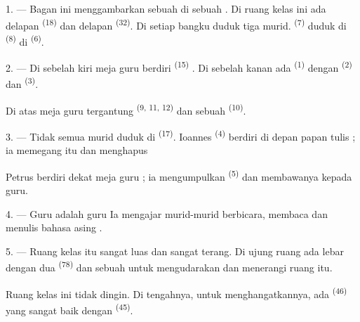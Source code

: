 \VUsaut{2.0mm}
\VUsaut{3.2mm}
\VUsaut{2.6mm}
\VUsaut{3.4mm}
\VUornamento{9pt}
\VUsaut{5.0mm}
\VUsaut{3.0mm}
\VUfilet{16mm}
\VUsaut{5.6mm}

\VUsaut{1.4mm}
\VUsaut{2.2mm}
\VUfilet{20mm}
\VUsaut{6.4mm}

\VUsaut{3.0mm}

1. --- Bagan ini menggambarkan sebuah  di sebuah
. Di ruang kelas ini ada delapan
 \textsuperscript{(18)} dan delapan 
\textsuperscript{(32)}. Di setiap bangku duduk tiga murid.
 \textsuperscript{(7)} duduk di 
\textsuperscript{(8)} di  \textsuperscript{(6)}.

2. --- Di sebelah kiri meja guru berdiri 
\textsuperscript{(15)} . Di sebelah kanan ada
 \textsuperscript{(1)} dengan 
\textsuperscript{(2)} dan  \textsuperscript{(3)}.

Di atas meja guru tergantung  \textsuperscript{(9,
11, 12)} dan sebuah  \textsuperscript{(10)}.

3. --- Tidak semua murid duduk di 
\textsuperscript{(17)}. Ioannes \textsuperscript{(4)} berdiri di depan
papan tulis ; ia memegang  itu dan menghapus

Petrus berdiri dekat meja guru ; ia mengumpulkan  \textsuperscript{(5)} dan membawanya kepada guru.

4. --- Guru  adalah guru  Ia
mengajar murid-murid berbicara, membaca dan menulis bahasa asing
.

5. --- Ruang kelas itu sangat luas dan sangat terang. Di ujung ruang
ada  lebar dengan dua 
\textsuperscript{(78)} dan sebuah  untuk
mengudarakan dan menerangi ruang itu.

Ruang kelas ini tidak dingin. Di tengahnya, untuk menghangatkannya,
ada  \textsuperscript{(46)} yang sangat baik dengan
 \textsuperscript{(45)}.

